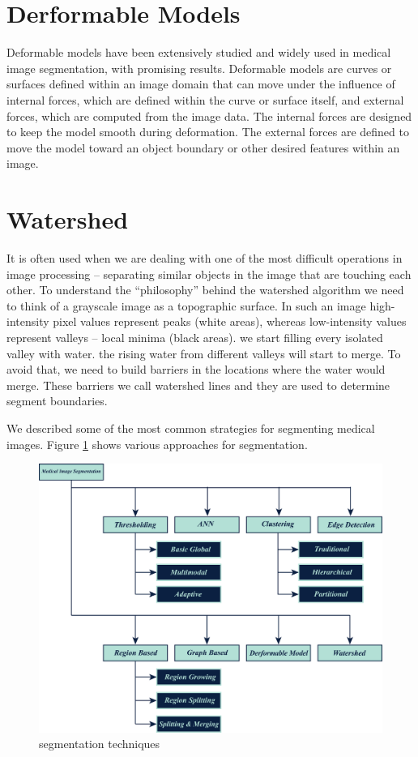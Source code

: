 \section{Derformable Models}

Deformable models have been extensively studied and widely used in medical image segmentation, with promising results. Deformable
models are curves or surfaces defined within an image domain that can
move under the influence of internal forces, which are defined within the curve or surface itself, and external forces, which are computed from the image data. The internal forces are designed to keep the model smooth during deformation. The external forces are defined to move the model toward an object boundary or other desired features within an image.

\section{Watershed}
It is often used when we are dealing with one of the most difficult operations in image processing – separating similar objects in the image that are touching each other. To understand the “philosophy” behind the watershed algorithm we need to think of a grayscale image as a topographic surface. In such an image high-intensity pixel values represent peaks (white areas), whereas low-intensity values represent valleys – local minima (black areas). we start filling every isolated valley with water. the rising water from different valleys will start to merge. To avoid that, we need to build barriers in the locations where the water would merge. These barriers we call watershed lines and they are used to determine segment boundaries.


We described some of the most common strategies for segmenting medical images. Figure \ref{fig20} shows various approaches for segmentation.

\begin{figure}[htbp]
	\centering \includegraphics[width=0.75\columnwidth]{./figures/Fig20.png}
	\caption{segmentation techniques}
	\label{fig20}
\end{figure}

